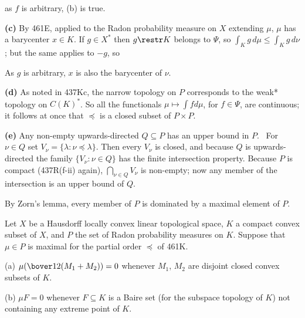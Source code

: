 {\noindent as $f$ is arbitrary, (b) is true.

\medskip

{\bf (c)} By 461E, applied to the Radon probability measure on $X$
extending $\mu$, $\mu$ has a barycenter $x\in K$.   If $g\in X^*$ then
$g\restr K$ belongs to $\Psi$, so $\int_Kg\,d\mu\le\int_Kg\,d\nu$;  but the
same applies to $-g$, so


\noindent As $g$ is arbitrary, $x$ is also the barycenter of $\nu$.

\medskip

{\bf (d)} As noted in 437Kc, the narrow topology on $P$ corresponds to the
weak* topology on $C(K)^*$.   So all the functionals
$\mu\mapsto\int fd\mu$, for $f\in\Psi$, are continuous;  it follows at once
that $\preccurlyeq$ is a closed subset of $P\times P$.

\medskip

{\bf (e)} Any non-empty
upwards-directed $Q\subseteq P$ has an upper bound in $P$.   \Prf\ For
$\nu\in Q$ set $V_{\nu}=\{\lambda:\nu\preccurlyeq\lambda\}$.   Then every
$V_{\nu}$ is closed, and because $Q$ is upwards-directed the family
$\{V_{\nu}:\nu\in Q\}$ has the finite intersection property.   Because $P$
is compact (437R(f-ii) again), $\bigcap_{\nu\in Q}V_{\nu}$ is non-empty;
now any member of the
intersection is an upper bound of $Q$.\ \Qed

By Zorn's lemma, every member of $P$ is dominated by a maximal element of
$P$.
}%

 Let $X$ be a Hausdorff locally convex linear
topological space, $K$ a compact convex subset of $X$, and $P$ the set of
Radon probability measures on $K$.   Suppose that
$\mu\in P$ is maximal for the partial order $\preccurlyeq$ of 461K.

(a) $\mu(\bover12(M_1+M_2))=0$ whenever $M_1$, $M_2$ are disjoint closed
convex subsets of $K$.

(b) $\mu F=0$ whenever $F\subseteq K$ is a Baire set (for the
subspace topology of $K$) not containing any extreme point of $K$.

